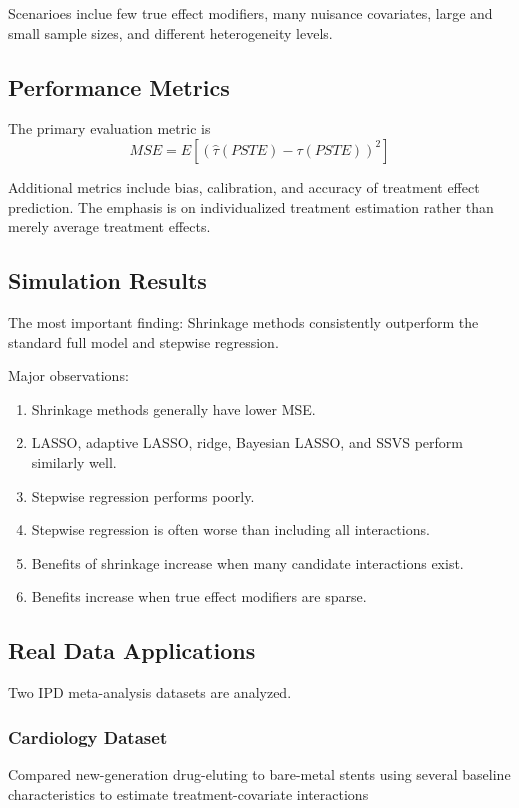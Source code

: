 \documentclass[11pt]{article}
\begin{document}
Scenarioes inclue few true effect modifiers, many nuisance covariates, large and small sample sizes, and different heterogeneity levels.

\subsection*{Performance Metrics}

The primary evaluation metric is \[MSE=E[(\hat{\tau}(PSTE)-\tau(PSTE))^2]\]

Additional metrics include bias, calibration, and accuracy of treatment effect prediction. The emphasis is on individualized treatment estimation rather than merely average treatment effects.

\subsection*{Simulation Results}

The most important finding: Shrinkage methods consistently outperform the standard full model and stepwise regression.

Major observations:

\begin{enumerate}
    \item Shrinkage methods generally have lower MSE.
    \item LASSO, adaptive LASSO, ridge, Bayesian LASSO, and SSVS perform similarly well.
    \item Stepwise regression performs poorly.
    \item Stepwise regression is often worse than including all interactions.
    \item Benefits of shrinkage increase when many candidate interactions exist.
    \item Benefits increase when true effect modifiers are sparse.
\end{enumerate}

\subsection*{Real Data Applications}

Two IPD meta-analysis datasets are analyzed.

\subsubsection*{Cardiology Dataset}

Compared new-generation drug-eluting to bare-metal stents using several baseline characteristics to estimate treatment-covariate interactions
\end{document}
